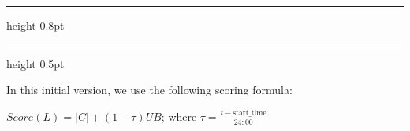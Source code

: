 \documentclass{article}
\begin{document}
\pagestyle{empty}
\allowdisplaybreaks[1] 
\setcounter{page}{1}


\setcounter{algorithm}{3}
\begin{center}
    \hrule height 0.8pt
    \vspace{0.3em}
    \label{alg:label_setting_ub_scoring_early_stopping}
    \vspace{0.2em}
    \hrule height 0.5pt
\end{center}

In this initial version, we use the following scoring formula: 

$Score(L) = |C| + (1 - \tau)UB$; where $\tau = \frac{t - \text{start\_time}}{24:00}$
\vspace{0.5em}
\end{document}
